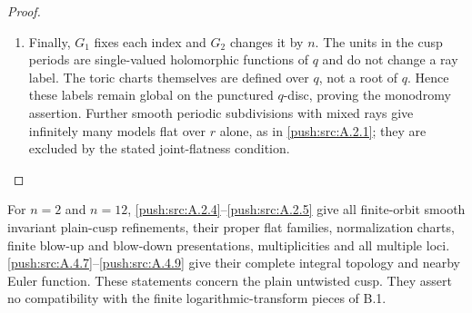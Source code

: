 \begin{proof}
\begin{enumerate}[label=\arabic*.,leftmargin=*]
\item Finally, $G_1$ fixes each index and $G_2$ changes it
by $n$. The units in the cusp periods are
single-valued holomorphic functions of $q$ and do
not change a ray label. The toric charts themselves
are defined over $q$, not a root of $q$. Hence
these labels remain global on the punctured
$q$-disc, proving the monodromy assertion. Further
smooth periodic subdivisions with mixed rays give
infinitely many models flat over $r$ alone, as in
\ref{push:src:A.2.1}; they are excluded by the stated joint-flatness
condition.
\end{enumerate}
\end{proof}

\begin{corollary}\label{push:src:B.2.2}\label{push:B22}

For $n=2$ and $n=12$, \ref{push:src:A.2.4}--\ref{push:src:A.2.5} give all
finite-orbit smooth invariant plain-cusp refinements,
their proper flat families, normalization charts,
finite blow-up and blow-down presentations,
multiplicities and all multiple loci. \ref{push:src:A.4.7}--\ref{push:src:A.4.9}
give their complete integral topology and nearby
Euler function. These statements concern the plain
untwisted cusp. They assert no compatibility with
the finite logarithmic-transform pieces of B.1.
\end{corollary}


